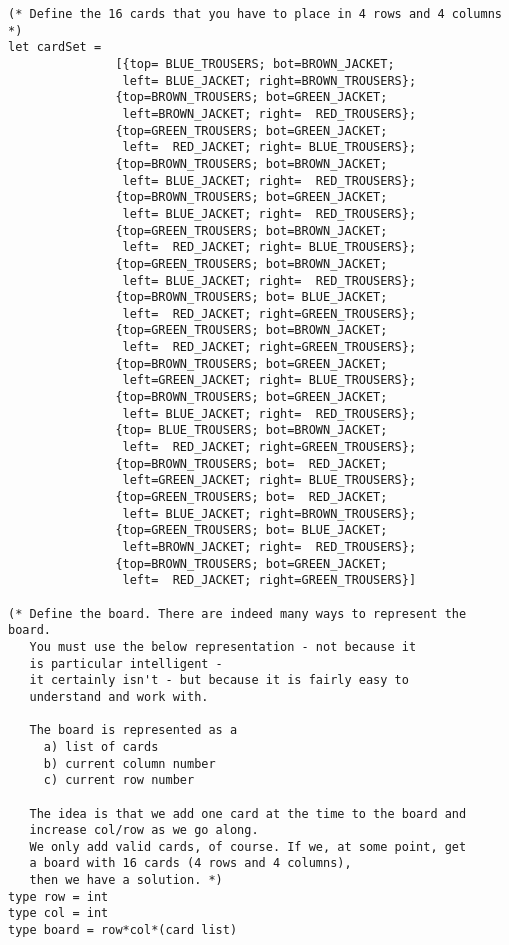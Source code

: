 \begin{lstlisting}
(* Define the 16 cards that you have to place in 4 rows and 4 columns *)
let cardSet = 
               [{top= BLUE_TROUSERS; bot=BROWN_JACKET; 
                left= BLUE_JACKET; right=BROWN_TROUSERS};
               {top=BROWN_TROUSERS; bot=GREEN_JACKET; 
                left=BROWN_JACKET; right=  RED_TROUSERS};
               {top=GREEN_TROUSERS; bot=GREEN_JACKET; 
                left=  RED_JACKET; right= BLUE_TROUSERS};
               {top=BROWN_TROUSERS; bot=BROWN_JACKET; 
                left= BLUE_JACKET; right=  RED_TROUSERS};
               {top=BROWN_TROUSERS; bot=GREEN_JACKET; 
                left= BLUE_JACKET; right=  RED_TROUSERS};
               {top=GREEN_TROUSERS; bot=BROWN_JACKET; 
                left=  RED_JACKET; right= BLUE_TROUSERS};
               {top=GREEN_TROUSERS; bot=BROWN_JACKET; 
                left= BLUE_JACKET; right=  RED_TROUSERS};
               {top=BROWN_TROUSERS; bot= BLUE_JACKET; 
                left=  RED_JACKET; right=GREEN_TROUSERS};
               {top=GREEN_TROUSERS; bot=BROWN_JACKET; 
                left=  RED_JACKET; right=GREEN_TROUSERS};
               {top=BROWN_TROUSERS; bot=GREEN_JACKET; 
                left=GREEN_JACKET; right= BLUE_TROUSERS};
               {top=BROWN_TROUSERS; bot=GREEN_JACKET; 
                left= BLUE_JACKET; right=  RED_TROUSERS};
               {top= BLUE_TROUSERS; bot=BROWN_JACKET; 
                left=  RED_JACKET; right=GREEN_TROUSERS};
               {top=BROWN_TROUSERS; bot=  RED_JACKET; 
                left=GREEN_JACKET; right= BLUE_TROUSERS};
               {top=GREEN_TROUSERS; bot=  RED_JACKET; 
                left= BLUE_JACKET; right=BROWN_TROUSERS};
               {top=GREEN_TROUSERS; bot= BLUE_JACKET; 
                left=BROWN_JACKET; right=  RED_TROUSERS};
               {top=BROWN_TROUSERS; bot=GREEN_JACKET; 
                left=  RED_JACKET; right=GREEN_TROUSERS}]

(* Define the board. There are indeed many ways to represent the board. 
   You must use the below representation - not because it 
   is particular intelligent - 
   it certainly isn't - but because it is fairly easy to 
   understand and work with. 

   The board is represented as a
     a) list of cards
     b) current column number
     c) current row number

   The idea is that we add one card at the time to the board and 
   increase col/row as we go along.
   We only add valid cards, of course. If we, at some point, get 
   a board with 16 cards (4 rows and 4 columns),
   then we have a solution. *)
type row = int
type col = int
type board = row*col*(card list)


\end{lstlisting}
